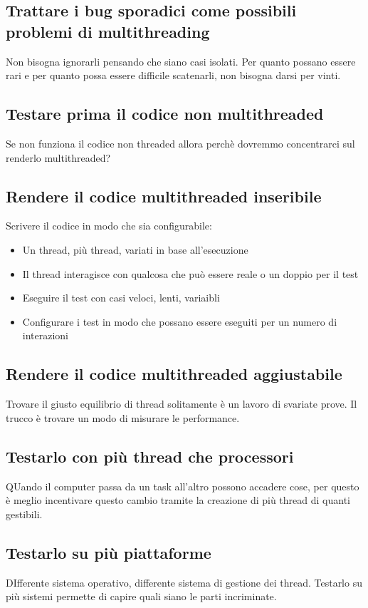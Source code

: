 \documentclass[11pt,a4paper]{book}
\begin{document}
\subsection{Trattare i bug sporadici come possibili problemi di multithreading}
Non bisogna ignorarli pensando che siano casi isolati. Per quanto possano essere rari e per quanto possa essere difficile scatenarli, non bisogna darsi per vinti.

\subsection{Testare prima il codice non multithreaded}
Se non funziona il codice non threaded allora perchè dovremmo concentrarci sul renderlo multithreaded?

\subsection{Rendere il codice multithreaded inseribile}
Scrivere il codice in modo che sia configurabile:
\begin{itemize}
	\item Un thread, più thread, variati in base all'esecuzione
	\item Il thread interagisce con qualcosa che può essere reale o un doppio per il test
	\item Eseguire il test con casi veloci, lenti, variaibli
	\item Configurare i test in modo che possano essere eseguiti per un numero di interazioni
\end{itemize}

\subsection{Rendere il codice multithreaded aggiustabile}
Trovare il giusto equilibrio di thread solitamente è un lavoro di svariate prove. Il trucco è trovare un modo di misurare le performance.

\subsection{Testarlo con più thread che processori}
QUando il computer passa da un task all'altro possono accadere cose, per questo è meglio incentivare questo cambio tramite la creazione di più thread di quanti gestibili.

\subsection{Testarlo su più piattaforme}
DIfferente sistema operativo, differente sistema di gestione dei thread. Testarlo su più sistemi permette di capire quali siano le parti incriminate.
\end{document}
